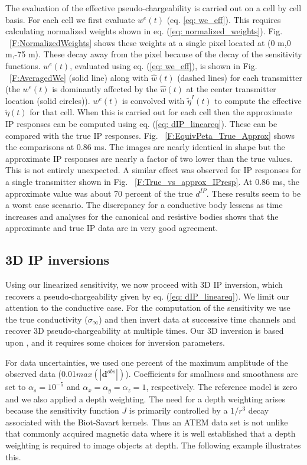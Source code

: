 \documentclass[extra,mreferee]{gji}
\newcommand{\siginf}{\sigma_\infty}
\newcommand{\peta}{\tilde{\eta}}
\newcommand{\dip}{d^{IP}}
\begin{document}
The evaluation of the effective pseudo-chargeability is carried out on  a cell by cell basis. For each cell  we  first evaluate $w^e(t)$ (eq. \ref{eq: we_eff}). This requires calculating normalized weights shown in eq. (\ref{eq: normalized_weights}). 
Fig. ~\ref{F:NormalizedWeights} shows these weights at a single pixel located at (0 m,0 m,-75 m). These decay away from the pixel because of the decay of the sensitivity functions. $w^e(t)$, evaluated using eq. (\ref{eq: we_eff}), is shown in Fig. ~\ref{F:AveragedWe} (solid line) along with $\hat{w}(t)$ (dashed lines) for each transmitter (the $w^e(t)$ is dominantly affected by the $\hat{w}(t)$ at the center transmitter location (solid circles)). $w^e(t)$ is convolved  with  $\peta^I(t)$ to compute the effective $\peta(t)$ for that cell. When this is carried out for each cell then the approximate IP responses can be computed using eq. (\ref{eq: dIP_lineareq}). These can be compared with the true IP responses. 
Fig. ~\ref{F:EquivPeta_True_Approx} shows the comparisons at 0.86 ms. The images are nearly identical in shape but the approximate IP responses are nearly a factor of two lower than the true values. This is not entirely unexpected. A similar effect was observed for IP responses for a single transmitter shown in Fig. ~\ref{F:True_vs_approx_IPresp}. At 0.86 ms, the approximate value was about 70 percent of the true $\dip$. These results seem to be a worst case scenario. The discrepancy for a conductive body lessens as time increases and analyses for the canonical and resistive bodies shows that the approximate and true IP data are in very good agreement. 

\subsection{3D IP inversions}
Using our linearized sensitivity, we now proceed with 3D IP inversion, which recovers a pseudo-chargeability given by eq. (\ref{eq: dIP_lineareq}). 
We limit our attention to the conductive case. For the computation of the sensitivity we use the true conductivity ($\siginf$) and then invert data at successive time channels and recover 3D pseudo-chargeability at multiple times. 
Our 3D inversion is based upon \cite[]{doug1994,Li2000}, and it requires some choices for inversion parameters. 

For data uncertainties, we used one percent of the maximum amplitude of the observed data (0.01$max(|\mathbf{d}^{obs}|)$). Coefficients for smallness and smoothness are set to $\alpha_s=10^{-5}$ and $\alpha_x=\alpha_y=\alpha_z=1$, respectively. The reference model is zero and we also applied a depth weighting. 
The need for a depth weighting arises because the sensitivity function $J$ is primarily controlled by a $1/r^3$ decay associated with the Biot-Savart kernels.  Thus an ATEM data set is not unlike that commonly acquired  magnetic data where it is well established that a depth weighting is required to image objects at depth. The following example illustrates this. 
\end{document}
